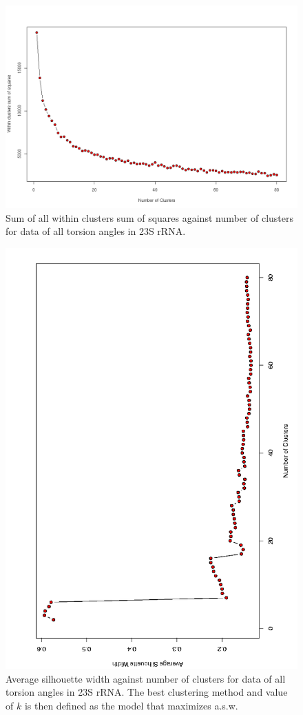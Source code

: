 \begin{figure}[H]
\centering
\includegraphics[angle=0, scale=0.35]{hartigan_nuclu_b.png}
\caption{Sum of all within clusters sum of squares against number of 
 clusters for data of all torsion angles in 23S rRNA.}
\label{fig:wss}
\end{figure}

\begin{figure}[H]
\centering
\includegraphics[angle=270, scale=0.48]{pam_asw_2_80_torsions.png}
\caption{Average silhouette width against  number of clusters for data
of  all torsion angles  in 23S  rRNA. The  best clustering  method and
value of $k$ is then defined as the model that maximizes a.s.w.}
\label{fig:asw}
\end{figure}

